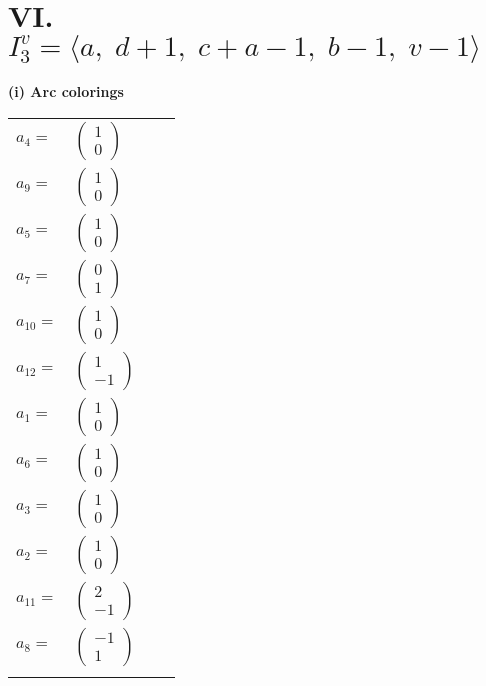 \documentclass[1p]{elsarticle_modified}
\theoremstyle{definition}
\begin{document}
\centering \section*{VI. $I^v_{3}= \langle a,\;d+1,\;c+a-1,\;b-1,\;v-1 \rangle$}
\flushleft \textbf{(i) Arc colorings}\\
\begin{tabular}{m{7pt} m{180pt} m{7pt} m{180pt} }
\flushright $a_{4}=$&$\begin{pmatrix}1\\0\end{pmatrix}$ \\
\flushright $a_{9}=$&$\begin{pmatrix}1\\0\end{pmatrix}$ \\
\flushright $a_{5}=$&$\begin{pmatrix}1\\0\end{pmatrix}$ \\
\flushright $a_{7}=$&$\begin{pmatrix}0\\1\end{pmatrix}$ \\
\flushright $a_{10}=$&$\begin{pmatrix}1\\0\end{pmatrix}$ \\
\flushright $a_{12}=$&$\begin{pmatrix}1\\-1\end{pmatrix}$ \\
\flushright $a_{1}=$&$\begin{pmatrix}1\\0\end{pmatrix}$ \\
\flushright $a_{6}=$&$\begin{pmatrix}1\\0\end{pmatrix}$ \\
\flushright $a_{3}=$&$\begin{pmatrix}1\\0\end{pmatrix}$ \\
\flushright $a_{2}=$&$\begin{pmatrix}1\\0\end{pmatrix}$ \\
\flushright $a_{11}=$&$\begin{pmatrix}2\\-1\end{pmatrix}$ \\
\flushright $a_{8}=$&$\begin{pmatrix}-1\\1\end{pmatrix}$\\&\end{tabular}
\end{document}
